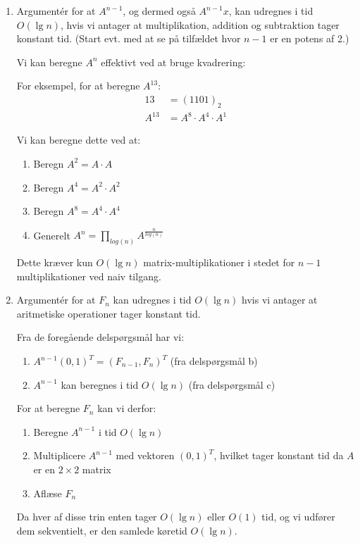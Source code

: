 \documentclass{article}
\theoremstyle{definition}
\begin{document}
\begin{enumerate}
\begin{enumerate}
    \end{enumerate}

    
    \item Argumentér for at $A^{n-1}$, og dermed også $A^{n-1}x$, kan udregnes i tid $O(\lg n)$, hvis vi antager at multiplikation, addition og subtraktion tager konstant tid. (Start evt. med at se på tilfældet hvor $n-1$ er en potens af 2.)
    
    Vi kan beregne $A^n$ effektivt ved at bruge kvadrering:
    
    For eksempel, for at beregne $A^{13}$:
    \begin{align*}
        13 &= (1101)_2 \\
        A^{13} &= A^8 \cdot A^4 \cdot A^1
    \end{align*}
    
    Vi kan beregne dette ved at:
    \begin{enumerate}
        \item Beregn $A^2 = A \cdot A$
        \item Beregn $A^4 = A^2 \cdot A^2$
        \item Beregn $A^8 = A^4 \cdot A^4$
        \item Generelt $A^n = \prod_{log(n)} A^{\frac{n}{log(n)}}$
    \end{enumerate}
    
    Dette kræver kun $O(\lg n)$ matrix-multiplikationer i stedet for $n-1$ multiplikationer ved naiv tilgang.

    \item Argumentér for at $F_n$ kan udregnes i tid $O(\lg n)$ hvis vi antager at aritmetiske operationer tager konstant tid.

    Fra de foregående delspørgsmål har vi:
    \begin{enumerate}
        \item $A^{n-1}(0,1)^T = (F_{n-1}, F_n)^T$ (fra delspørgsmål b)
        \item $A^{n-1}$ kan beregnes i tid $O(\lg n)$ (fra delspørgsmål c)
    \end{enumerate}

    For at beregne $F_n$ kan vi derfor:
    \begin{enumerate}
        \item Beregne $A^{n-1}$ i tid $O(\lg n)$
        \item Multiplicere $A^{n-1}$ med vektoren $(0,1)^T$, hvilket tager konstant tid da $A$ er en $2 \times 2$ matrix
        \item Aflæse $F_n$ 
    \end{enumerate}

    Da hver af disse trin enten tager $O(\lg n)$ eller $O(1)$ tid, og vi udfører dem sekventielt, er den samlede køretid $O(\lg n)$.



\end{enumerate}
\end{document}
